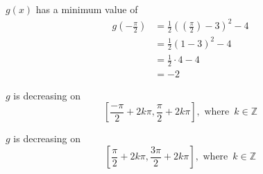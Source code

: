\documentclass{ximera}
\begin{document}
$g(x)$ has a minimum value of
\begin{align*}
g\left( -\frac{\pi}{2} \right) &= \frac{1}{2} \left(\left( \frac{\pi}{2} \right) - 3 \right)^2 - 4 \\
                               &= \frac{1}{2} (1 - 3)^2 - 4 \\
                               &= \frac{1}{2} \cdot 4 - 4 \\
                               &=  -2
\end{align*}



$g$ is decreasing on 
\[
\left[ \frac{-\pi}{2} + 2k\pi, \frac{\pi}{2} + 2k\pi \right], \text{ where } \,  k \in \mathbb{Z}
\]




$g$ is decreasing on 
\[
\left[ \frac{\pi}{2} + 2k\pi, \frac{3\pi}{2} + 2k\pi \right], \text{ where } \,  k \in \mathbb{Z}
\]
\end{document}
